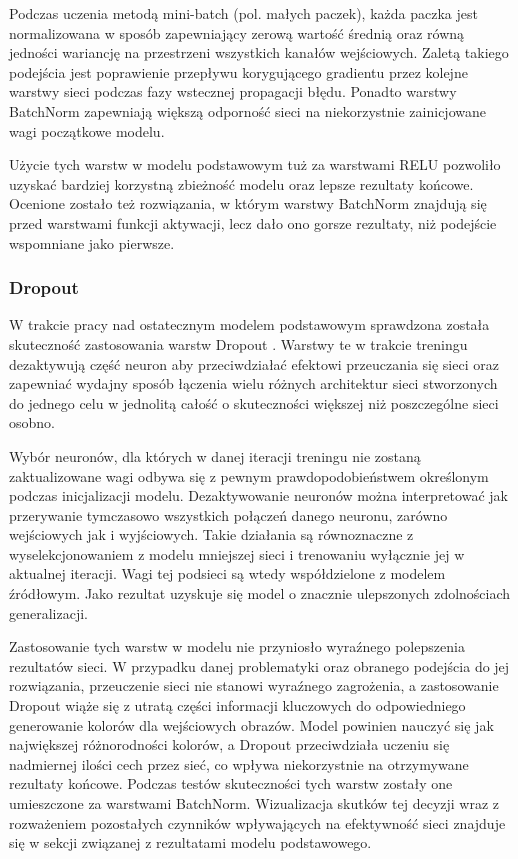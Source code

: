   Podczas uczenia metodą mini-batch (pol. małych paczek), każda paczka jest
  normalizowana w sposób zapewniający zerową wartość średnią oraz
  równą jedności wariancję na przestrzeni wszystkich kanałów wejściowych.
  Zaletą takiego podejścia jest poprawienie przepływu korygującego gradientu
  przez kolejne warstwy sieci podczas fazy wstecznej propagacji błędu. Ponadto
  warstwy BatchNorm zapewniają większą odporność sieci na niekorzystnie zainicjowane
  wagi początkowe modelu.

  Użycie tych warstw w modelu podstawowym tuż za warstwami RELU pozwoliło
  uzyskać bardziej korzystną zbieżność modelu oraz lepsze rezultaty końcowe.
  Ocenione zostało też rozwiązania, w którym warstwy BatchNorm znajdują się
  przed warstwami funkcji aktywacji, lecz dało ono gorsze rezultaty, niż
  podejście wspomniane jako pierwsze.

  \subsubsection{Dropout}

  W trakcie pracy nad ostatecznym modelem podstawowym sprawdzona została
  skuteczność zastosowania warstw Dropout \cite{dropout}. Warstwy te w trakcie
  treningu dezaktywują część neuron aby przeciwdziałać efektowi przeuczania
  się sieci oraz zapewniać wydajny sposób łączenia wielu różnych architektur
  sieci stworzonych do jednego celu w jednolitą całość o skuteczności większej
  niż poszczególne sieci osobno.

  Wybór neuronów, dla których w danej iteracji treningu nie zostaną
  zaktualizowane wagi odbywa się z pewnym prawdopodobieństwem określonym
  podczas inicjalizacji modelu. Dezaktywowanie neuronów można interpretować jak
  przerywanie tymczasowo wszystkich połączeń danego neuronu, zarówno wejściowych
  jak i wyjściowych. Takie działania są równoznaczne z wyselekcjonowaniem z modelu
  mniejszej sieci i trenowaniu wyłącznie jej w aktualnej iteracji. Wagi tej
  podsieci są wtedy współdzielone z modelem źródłowym.
  Jako rezultat uzyskuje się model o znacznie ulepszonych zdolnościach generalizacji.

  Zastosowanie tych warstw w modelu nie przyniosło wyraźnego polepszenia rezultatów
  sieci. W przypadku danej problematyki oraz obranego podejścia do jej rozwiązania,
  przeuczenie sieci nie stanowi wyraźnego zagrożenia, a zastosowanie Dropout
  wiąże się z utratą części informacji kluczowych do odpowiedniego
  generowanie kolorów dla wejściowych obrazów. Model powinien nauczyć się jak
  największej różnorodności kolorów, a Dropout przeciwdziała uczeniu się
  nadmiernej ilości cech przez sieć, co wpływa niekorzystnie na otrzymywane
  rezultaty końcowe. Podczas testów skuteczności tych warstw zostały one umieszczone
  za warstwami BatchNorm. Wizualizacja skutków tej decyzji wraz z rozważeniem
  pozostałych czynników wpływających na efektywność sieci znajduje się w
  sekcji związanej z rezultatami modelu podstawowego.

